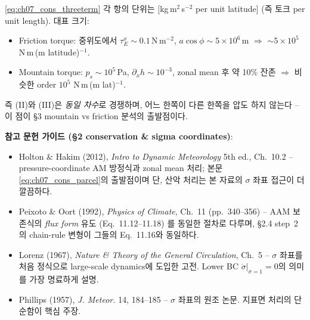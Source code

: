 \begin{remark}\label{rem:ch07_cons_units}
\eqref{eq:ch07_cons_threeterm} 각 항의 단위는 [kg\,m$^2$\,s$^{-2}$ per unit
latitude] (즉 토크 per unit length).  대표 크기:
\begin{itemize}
  \item Friction torque: 중위도에서 $\tau_E^x \sim 0.1$\,N\,m$^{-2}$,
        $a\cos\phi \sim 5\times 10^6$\,m $\Rightarrow$ $\sim 5\times 10^5$
        N\,m\,(m latitude)$^{-1}$.
  \item Mountain torque: $p_s \sim 10^5$\,Pa, $\partial_x h \sim 10^{-3}$,
        zonal mean 후 약 10\% 잔존 $\Rightarrow$ 비슷한 order $10^5$
        N\,m\,(m lat)$^{-1}$.
\end{itemize}
즉 (II)와 (III)은 \emph{동일 차수}로 경쟁하며, 어느 한쪽이 다른 한쪽을 압도
하지 않는다 -- 이 점이 \S3 mountain vs friction 분석의 출발점이다.
\end{remark}

\begin{hisublock}
\textbf{참고 문헌 가이드 (\S2 conservation \& sigma coordinates)}:
\begin{itemize}
  \item Holton \& Hakim (2012), \textit{Intro to Dynamic Meteorology} 5th ed.,
        Ch.~10.2 -- pressure-coordinate AM 방정식과 zonal mean 처리; 본문
        \eqref{eq:ch07_cons_parcel}의 출발점이며 단, 산악 처리는 본 자료의
        $\sigma$ 좌표 접근이 더 깔끔하다.
  \item Peixoto \& Oort (1992), \textit{Physics of Climate}, Ch.~11
        (pp.~340--356) -- AAM 보존식의 \emph{flux form} 유도 (Eq.~11.12--11.18)
        를 동일한 절차로 다루며, \S2.4 step~2의 chain-rule 변형이 그들의
        Eq.~11.16와 동일하다.
  \item Lorenz (1967), \textit{Nature \& Theory of the General Circulation},
        Ch.~5 -- $\sigma$ 좌표를 처음 정식으로 large-scale dynamics에 도입한
        고전.  Lower BC $\dot\sigma|_{\sigma=1}=0$의 의미를 가장 명료하게
        설명.
  \item Phillips (1957), \textit{J. Meteor.} 14, 184--185 -- $\sigma$ 좌표의
        원조 논문.  지표면 처리의 단순함이 핵심 주장.
\end{itemize}
\end{hisublock}


